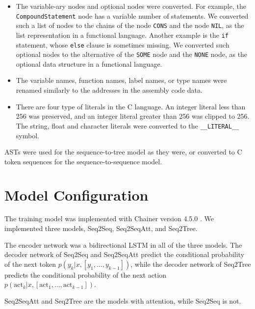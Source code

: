 \documentclass[senior,final,11pt]{iscs-thesis}
\begin{document}
\begin{itemize}
\item The variable-ary nodes and optional nodes were converted. 
For example, the \texttt{CompoundStatement} node has a variable number of statements. 
We converted such a list of nodes to the chains of the node \texttt{CONS} and the node \texttt{NIL}, as the list representation in a functional language.
Another example is the \texttt{if} statement, whose \texttt{else} clause is sometimes missing. 
We converted such optional nodes to the alternative of the \texttt{SOME} node and the \texttt{NONE} node, as the optional data structure in a functional language.
\item The variable names, function names, label names, or type names were renamed similarly to the addresses in the assembly code data.
\item There are four type of literals in the C language. 
An integer literal less than 256 was preserved, and an integer literal greater than 256 was clipped to 256.
The string, float and character literals were converted to the \texttt{\_\_LITERAL\_\_} symbol.

\end{itemize}

ASTs were used for the sequence-to-tree model as they were, or converted to C token sequences for the sequence-to-sequence model. 

\section{Model Configuration}
The training model was implemented with Chainer version 4.5.0 \citep{chainer}.
We implemented three models, Seq2Seq, Seq2SeqAtt, and Seq2Tree.

The encoder network was a bidirectional LSTM in all of the three models.
The decoder network of Seq2Seq and Seq2SeqAtt predict the conditional probability of the next token $ p(y_k|x,[y_1,\dots,y_{k-1}]) $,
while the decoder network of Seq2Tree predicts the conditional probability of the next action $ p(\mathrm{act}_{k}|x,[\mathrm{act}_1, \dots, \mathrm{act}_{k-1}]) $.

Seq2SeqAtt and Seq2Tree are the models with attention, while Seq2Seq is not.
\end{document}
